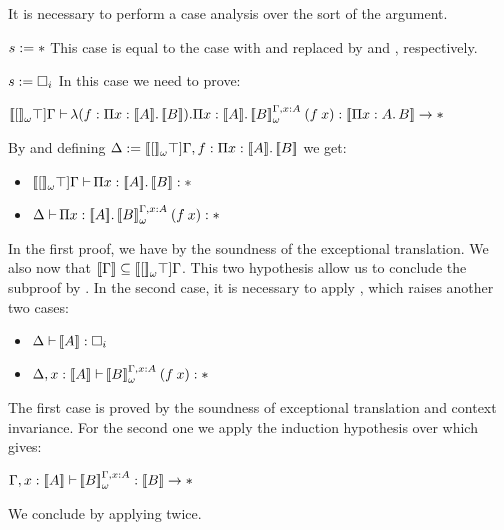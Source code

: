 \begin{Proof}
\begin{ProofCase}{\CicImpred}
It is necessary to perform a case analysis over the sort of the argument.
\begin{SubProofCase}{$s:=\ast$}
This case is equal to the \CicTypeProd case with \Type{} and \WContextTrans[\False]{\Context}
replaced by \Prop{} and \WContextTrans[\True]{\Context}, respectively.  
\end{SubProofCase}

\begin{SubProofCase}{$s\termDef\Type$}
In this case we need to prove:
\begin{center}
$\ctyping[][\WContextTrans[\True]{\Context}]{%
           \varabs{f}{\depArrow{x}{\TypeTrans{A}}{\TypeTrans{B}}}{%
                  \depArrow{x}{\TypeTrans{A}}{
                            \app{\WParamTypeTrans[\Context,\typing{x}{A}]{B}}{(\app{f}{x})}}}}{%
           \arrow{\TypeTrans{\depArrow{x}{A}{B}}}{\Prop}}
$
\end{center}
By \CicAbs{} and defining
$\varContext\termDef\WContextTrans[\True]{\Context},\typing{f}{\depArrow{x}{\TypeTrans{A}}{\TypeTrans{B}}}$
we get:
\begin{itemize}
\item $\ctyping[][\WContextTrans[\True]{\Context}]{\depArrow{x}{\TypeTrans{A}}{\TypeTrans{B}}}{\Prop}$
\item $\ctyping[][\varContext]{\depArrow{x}{\TypeTrans{A}}{
                                       \app{\WParamTypeTrans[\Context,\typing{x}{A}]{B}}{(\app{f}{x})}}}{
                             \Prop}$
\end{itemize}
In the first proof, we have 
 by the 
soundness of the exceptional translation. We also now that
$\TypeTrans{\Context} \subseteq \WContextTrans[\True]{\Context}$. This two hypothesis allow us to conclude 
the subproof by . 
In the second case, it is necessary to apply \CicAbs{}, which raises another two cases:
\begin{itemize}
\item $\ctyping[][\varContext]{\TypeTrans{A}}{\Type}$
\item $\ctyping[][\varContext,\typing{x}{\TypeTrans{A}}]{
                                       \app{\WParamTypeTrans[\Context,\typing{x}{A}]{B}}{(\app{f}{x})}}{
                             \Prop}$
\end{itemize}
The first case is proved by the soundness of exceptional translation and context invariance. For the second one 
we apply the induction hypothesis over  which gives:
\begin{center}
$\ctyping[\typing{x}{\TypeTrans{A}}]{\WParamTypeTrans[\Context,\typing{x}{A}]{B}}{\arrow{\TypeTrans{B}}{\Prop}}$
\end{center}
We conclude by applying \CicAbs{} twice.
\end{SubProofCase}
\end{ProofCase}


\end{Proof}
